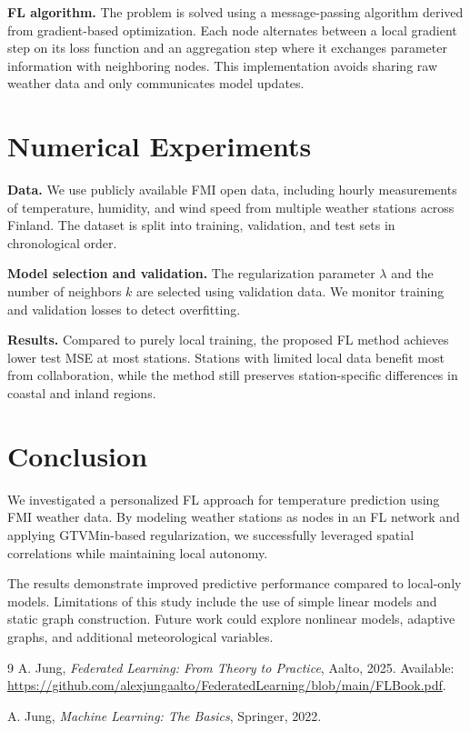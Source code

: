 \documentclass[9pt]{article}
\begin{document}
	{\bf FL algorithm.}
	The problem is solved using a message-passing algorithm derived from gradient-based
	optimization.
	Each node alternates between a local gradient step on its loss function and an
	aggregation step where it exchanges parameter information with neighboring nodes.
	This implementation avoids sharing raw weather data and only communicates model updates.
	
	\section{Numerical Experiments}
	\label{sec:experiments}
	
	{\bf Data.}
	We use publicly available FMI open data, including hourly measurements of temperature,
	humidity, and wind speed from multiple weather stations across Finland.
	The dataset is split into training, validation, and test sets in chronological order.
	
	{\bf Model selection and validation.}
	The regularization parameter $\lambda$ and the number of neighbors $k$ are selected using
	validation data.
	We monitor training and validation losses to detect overfitting.
	
	{\bf Results.}
	Compared to purely local training, the proposed FL method achieves lower test MSE at most
	stations.
	Stations with limited local data benefit most from collaboration, while the method still
	preserves station-specific differences in coastal and inland regions.
	
	\section{Conclusion}
	\label{sec:conclusion}
	
	We investigated a personalized FL approach for temperature prediction using FMI weather data.
	By modeling weather stations as nodes in an FL network and applying GTVMin-based regularization,
	we successfully leveraged spatial correlations while maintaining local autonomy.
	
	The results demonstrate improved predictive performance compared to local-only models.
	Limitations of this study include the use of simple linear models and static graph
	construction.
	Future work could explore nonlinear models, adaptive graphs, and additional meteorological
	variables.
	
	\begin{thebibliography}{9}
		A. Jung,
		\textit{Federated Learning: From Theory to Practice},
		Aalto, 2025.
		Available:
		\url{https://github.com/alexjungaalto/FederatedLearning/blob/main/FLBook.pdf}.
		
		A. Jung,
		\textit{Machine Learning: The Basics},
		Springer, 2022.
	\end{thebibliography}
	
\end{document}
